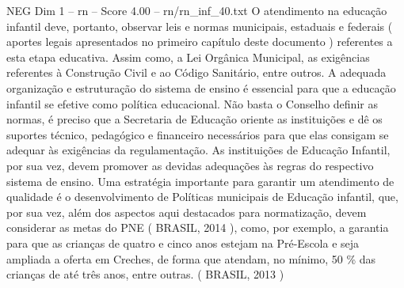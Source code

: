 \begin{textsample}{NEG Dim 1 – rn – Score 4.00 – rn/rn\_inf\_40.txt}
O atendimento na educação infantil deve, portanto, observar leis e normas municipais, estaduais e federais ( aportes legais apresentados no primeiro capítulo deste documento ) referentes a esta etapa educativa.
Assim como, a Lei Orgânica Municipal, as exigências referentes à Construção Civil e ao Código Sanitário, entre outros.
A adequada organização e estruturação do sistema de ensino é essencial para que a educação infantil se efetive como política educacional.
Não basta o Conselho definir as normas, é preciso que a Secretaria de Educação oriente as instituições e dê os suportes técnico, pedagógico e financeiro necessários para que elas consigam se adequar às exigências da regulamentação.
As instituições de Educação Infantil, por sua vez, devem promover as devidas adequações às regras do respectivo sistema de ensino.
Uma estratégia importante para garantir um atendimento de qualidade é o desenvolvimento de Políticas municipais de Educação infantil, que, por sua vez, além dos aspectos aqui destacados para normatização, devem considerar as metas do PNE ( BRASIL, 2014 ), como, por exemplo, a garantia para que as crianças de quatro e cinco anos estejam na Pré-Escola e seja ampliada a oferta em Creches, de forma que atendam, no mínimo, 50 \% das crianças de até três anos, entre outras. ( BRASIL, 2013 )

\end{textsample}
